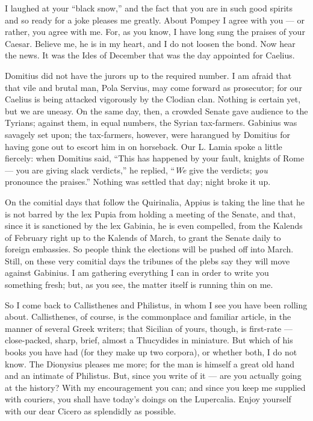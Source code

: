 

 I laughed at your ``black snow,'' and the fact that you are in such good spirits and so ready for a joke pleases me greatly. About Pompey I agree with you --- or rather, you agree with me. For, as you know, I have long sung the praises of your Caesar. Believe me, he is in my heart, and I do not loosen the bond. Now hear the news. It was the Ides of December that was the day appointed for Caelius.

 Domitius did not have the jurors up to the required number. I am afraid that that vile and brutal man, Pola Servius, may come forward as prosecutor; for our Caelius is being attacked vigorously by the Clodian clan. Nothing is certain yet, but we are uneasy. On the same day, then, a crowded Senate gave audience to the Tyrians; against them, in equal numbers, the Syrian tax-farmers. Gabinius was savagely set upon; the tax-farmers, however, were harangued by Domitius for having gone out to escort him in on horseback. Our L. Lamia spoke a little fiercely: when Domitius said, ``This has happened by your fault, knights of Rome --- you are giving slack verdicts,'' he replied, ``\textit{We} give the verdicts; \textit{you} pronounce the praises.'' Nothing was settled that day; night broke it up.

 On the comitial days that follow the Quirinalia, Appius is taking the line that he is not barred by the lex Pupia from holding a meeting of the Senate, and that, since it is sanctioned by the lex Gabinia, he is even compelled, from the Kalends of February right up to the Kalends of March, to grant the Senate daily to foreign embassies. So people think the elections will be pushed off into March. Still, on these very comitial days the tribunes of the plebs say they will move against Gabinius. I am gathering everything I can in order to write you something fresh; but, as you see, the matter itself is running thin on me.

 So I come back to Callisthenes and Philistus, in whom I see you have been rolling about. Callisthenes, of course, is the commonplace and familiar article, in the manner of several Greek writers; that Sicilian of yours, though, is first-rate --- close-packed, sharp, brief, almost a Thucydides in miniature. But which of his books you have had (for they make up two corpora), or whether both, I do not know. The Dionysius pleases me more; for the man is himself a great old hand and an intimate of Philistus. But, since you write of it --- are you actually going at the history? With my encouragement you can; and since you keep me supplied with couriers, you shall have today's doings on the Lupercalia. Enjoy yourself with our dear Cicero as splendidly as possible.
